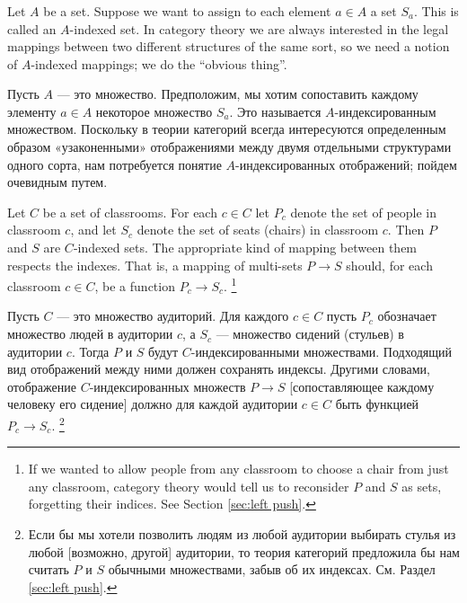 \documentclass[CT4S-EN-RU]{subfiles}
\begin{document}

\subsubsection{}\label{sec:indexed sets}

\begin{blockENG}
Let $A$ be a set. Suppose we want to assign to each element $a\in A$ a set $S_a$. This is called an $A$-indexed set. In category theory we are always interested in the legal mappings between two different structures of the same sort, so we need a notion of $A$-indexed mappings; we do the “obvious thing”.
\end{blockENG}

\begin{blockRUS}
Пусть $A$ — это множество. Предположим, мы хотим сопоставить каждому элементу $a\in A$ некоторое множество $S_a$. Это называется $A$-индексированным множеством. Поскольку в теории категорий всегда интересуются определенным образом «узаконенными» отображениями между двумя отдельными структурами одного сорта, нам потребуется понятие $A$-индексированных отображений; пойдем очевидным путем. 
\end{blockRUS}

\begin{exampleENG}\label{ex:classroom seats}
Let $C$ be a set of classrooms. For each $c\in C$ let $P_c$ denote the set of people in classroom $c$, and let $S_c$ denote the set of seats (chairs) in classroom $c$. Then $P$ and $S$ are $C$-indexed sets. The appropriate kind of mapping between them respects the indexes. That is, a mapping of multi-sets $P\to S$ should, for each classroom $c\in C$, be a function $P_c\to S_c$.%
\footnote{If we wanted to allow people from any classroom to choose a chair from just any classroom, category theory would tell us to reconsider $P$ and $S$ as sets, forgetting their indices. See Section \ref{sec:left push}.}
\end{exampleENG}

\begin{exampleRUS}\label{ex:classroom seats}
Пусть $C$ — это множество аудиторий. Для каждого $c\in C$ пусть $P_c$ обозначает множество людей в аудитории $c$, а $S_c$ — множество сидений (стульев) в аудитории $c$. Тогда $P$ и $S$ будут $C$-индексированными множествами. Подходящий вид отображений между ними должен сохранять индексы. Другими словами, отображение $C$-индексированных множеств $P\to S$ [сопоставляющее каждому человеку его сидение] должно для каждой аудитории $c\in C$ быть функцией $P_c\to S_c$.%
\footnote{Если бы мы хотели позволить людям из любой аудитории выбирать стулья из любой [возможно, другой] аудитории, то теория категорий предложила бы нам считать $P$ и $S$ обычными множествами, забыв об их индексах. См. Раздел \ref{sec:left push}.}
\end{exampleRUS}
\end{document}
